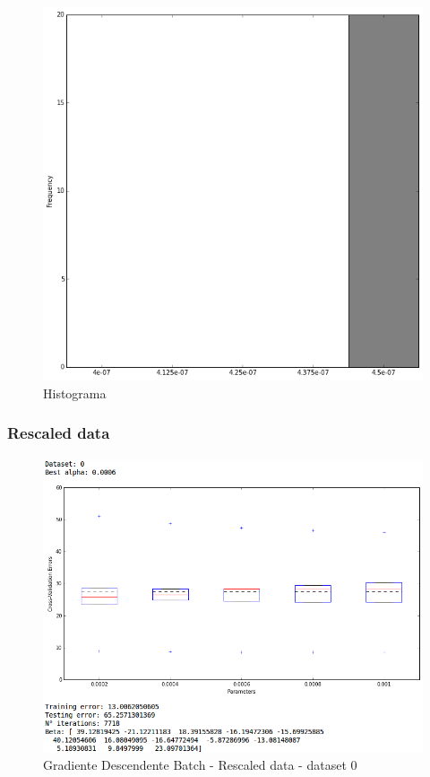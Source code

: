 \documentclass[spanish, fleqn]{article}
\begin{document}
\begin{enumerate}
\begin{figure}[!htpb]
\centering
 \includegraphics[scale=0.4]{hist_gd_batch_raw.png}
 \caption{Histograma}
\end{figure}

\subsubsection*{Rescaled data}
\begin{figure}[!htpb]
\centering
 \includegraphics[scale=0.45]{gd_batch_rescaled0.png}
 \caption{Gradiente Descendente Batch - Rescaled data - dataset 0}
\end{figure}


\end{enumerate}
\end{document}
